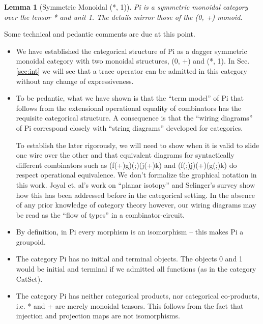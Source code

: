 \documentclass[preprint]{sigplanconf}
\newtheorem{lemma}[theorem]{Lemma}
\begin{document}
\begin{lemma}[Symmetric Monoidal {{(*, 1)}}]
  {{Pi}} is a symmetric monoidal category over the tensor {{*}} and
  unit {{1}}. The details mirror those of the {{(0, +)}} monoid.
\end{lemma}

\noindent
Some technical and pedantic comments are due at this point. 

\begin{itemize}
\item We have established the categorical structure of {{Pi}} as a
  dagger symmetric monoidal category with two monoidal structures,
  {{(0, +)}} and {{(*, 1)}}. In Sec. \ref{sec:int} we will see that a
  {{trace}} operator can be admitted in this category without any
  change of expressiveness.

\item To be pedantic, what we have shown is that the ``term model'' of
  {{Pi}} that follows from the extensional operational equality of
  combinators has the requisite categorical structure. A consequence
  is that the ``wiring diagrams'' of {{Pi}} correspond closely with ``string
  diagrams'' developed for categories.

  To establish the later rigorously, we will need to show when it is
  valid to slide one wire over the other and that equivalent diagrams
  for syntactically different combinators such as
  {{(f(+)g)(;)(j(+)k)}} and {{(f(;)j)(+)(g(;)k)}} do respect
  operational equivalence.  We don't formalize the graphical notation
  in this work. Joyal et. al's work on ``planar isotopy'' and
  Selinger's survey \cite{springerlink:10.1007/978-3-642-12821-94}
  show how this has been addressed before in the categorical
  setting. In the absence of any prior knowledge of category theory
  however, our wiring diagrams may be read as the ``flow of types'' in
  a combinator-circuit.

\item By definition, in {{Pi}} every morphism is an isomorphism --
  this makes {{Pi}} a groupoid.

\item The category {{Pi}} has no initial and terminal objects. The
  objects {{0}} and {{1}} would be initial and terminal if we admitted
  all functions (as in the category {{CatSet}}).

\item The category {{Pi}} has neither categorical products, nor
  categorical co-products, i.e. {{*}} and {{+}} are merely monoidal
  tensors. This follows from the fact that injection and projection
  maps are not isomorphisms.
\end{itemize}
\end{document}
